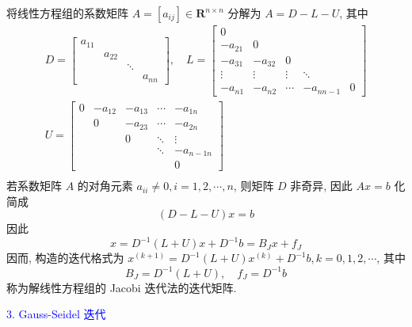 将线性方程组的系数矩阵 $ A=\left[a_{i j}\right] \in \mathbf{R}^{n \times n} $ 分解为 $ A=D-L-U $, 其中
$$
\begin{array}{l}
D=\left[\begin{array}{llll}
a_{11} & & & \\
& a_{22} & & \\
& & \ddots & \\
& & & a_{n n}
\end{array}\right], \quad L=\left[\begin{array}{ccccc}
0 & & & & \\
-a_{21} & 0 & & & \\
-a_{31} & -a_{32} & 0 & & \\
\vdots & \vdots & \vdots & \ddots & \\
-a_{n 1} & -a_{n 2} & \cdots & -a_{n n-1} & 0
\end{array}\right] \\
U=\left[\begin{array}{ccccc}
0 & -a_{12} & -a_{13} & \cdots & -a_{1 n} \\
& 0 & -a_{23} & \cdots & -a_{2 n} \\
& & 0 & \ddots & \vdots \\
& & & \ddots & -a_{n-1 n} \\
& & & & 0
\end{array}\right] \\
\end{array}
$$
若系数矩阵 $ A $ 的对角元素 $ a_{i i} \neq 0, i=1,2, \cdots, n $, 则矩阵 $ D $ 非奇异, 因此 $ A x=b $ 化简成
$$
(D-L-U) x=b
$$
因此
$$
x=D^{-1}(L+U) x+D^{-1} b=B_{J} x+f_{J}
$$
因而, 构造的迭代格式为 $ x^{(k+1)}=D^{-1}(L+U) x^{(k)}+D^{-1} b, k=0,1,2, \cdots $, 其中
$$
B_{J}=D^{-1}(L+U), \quad f_{J}=D^{-1} b
$$
称为解线性方程组的 Jacobi 迭代法的迭代矩阵.

\textcolor{blue}{3. Gauss-Seidel 迭代}

